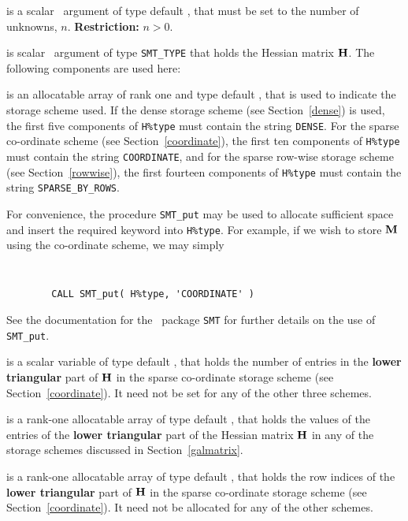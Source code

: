 \documentclass{galahad}
\begin{document}
\begin{description}

 is a scalar \intentin\ argument of type default \integer, that must be
set to the number of unknowns, $n$. {\bf Restriction: } $n  >  0$.

 is scalar \intentin\ argument of type {\tt SMT\_TYPE}
that holds the Hessian matrix ${\mathbf{H}}$. The following components
are used here:

\begin{description}

 is an allocatable array of rank one and type default
\character, that
is used to indicate the storage scheme used. If the dense storage scheme
(see Section~\ref{dense}) is used,
the first five components of {\tt H\%type} must contain the
string {\tt DENSE}.
For the sparse co-ordinate scheme (see Section~\ref{coordinate}),
the first ten components of {\tt H\%type} must contain the
string {\tt COORDINATE},
and for the sparse row-wise storage scheme (see Section~\ref{rowwise}),
the first fourteen components of {\tt H\%type} must contain the
string {\tt SPARSE\_BY\_ROWS}.

For convenience, the procedure {\tt SMT\_put}
may be used to allocate sufficient space and insert the required keyword
into {\tt H\%type}.
For example, if we wish to store ${\mathbf{M}}$ using the co-ordinate scheme,
we may simply
{\tt
\begin{verbatim}
        CALL SMT_put( H%type, 'COORDINATE' )
\end{verbatim}
}
\noindent
See the documentation for the \galahad\ package {\tt SMT}
for further details on the use of {\tt SMT\_put}.

 is a scalar variable of type default \integer, that
holds the number of entries in the {\bf lower triangular} part of ${\mathbf{H}}$
in the sparse co-ordinate storage scheme (see Section~\ref{coordinate}).
It need not be set for any of the other three schemes.

 is a rank-one allocatable array of type default \realdp, that holds
the values of the entries of the {\bf lower triangular} part
of the Hessian matrix ${\mathbf{H}}$ in any of the
storage schemes discussed in Section~\ref{galmatrix}.

 is a rank-one allocatable array of type default \integer,
that holds the row indices of the {\bf lower triangular} part of ${\mathbf{H}}$
in the sparse co-ordinate storage
scheme (see Section~\ref{coordinate}).
It need not be allocated for any of the other schemes.


\end{description}
\end{description}
\end{document}
